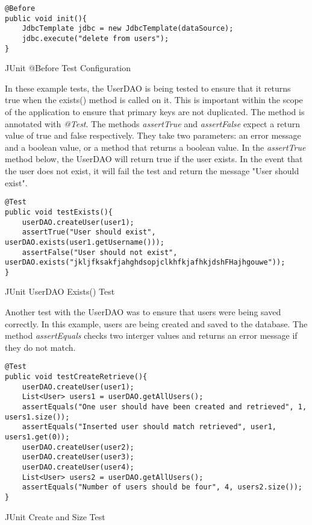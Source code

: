 \begin{table}[H]
\begin{lstlisting}
@Before
public void init(){
	JdbcTemplate jdbc = new JdbcTemplate(dataSource);
	jdbc.execute("delete from users"); 
}
\end{lstlisting}
\caption{JUnit @Before Test Configuration}
\end{table}

In these example tests, the UserDAO is being tested to ensure that it returns true when the exists() method is called on it. This is important within the scope of the application to ensure that primary keys are not duplicated. The method is annotated with \textit{@Test}. The methods \textit{assertTrue} and \textit{assertFalse} expect a return value of true and false respectively. They take two parameters: an error message and a boolean value, or a method that returns a boolean value. In the \textit{assertTrue} method below, the UserDAO will return true if the user exists. In the event that the user does not exist, it will fail the test and return the message "User should exist".\newline 

\begin{table}[H]
\begin{lstlisting}
@Test
public void testExists(){
	userDAO.createUser(user1);
	assertTrue("User should exist", userDAO.exists(user1.getUsername()));
	assertFalse("User should not exist", userDAO.exists("jkljfksakfjahghdsopjclkhfkjafhkjdshFHajhgouwe"));
}
\end{lstlisting}
\caption{JUnit UserDAO Exists() Test}
\end{table}

Another test with the UserDAO was to ensure that users were being saved correctly. In this example, users are being created and saved to the database. The method \textit{assertEquals} checks two interger values and returns an error message if they do not match.

\begin{table}[H]
\begin{lstlisting}
@Test 
public void testCreateRetrieve(){
	userDAO.createUser(user1);
	List<User> users1 = userDAO.getAllUsers();
	assertEquals("One user should have been created and retrieved", 1, users1.size());
	assertEquals("Inserted user should match retrieved", user1, users1.get(0));
	userDAO.createUser(user2);
	userDAO.createUser(user3);
	userDAO.createUser(user4);
	List<User> users2 = userDAO.getAllUsers();
	assertEquals("Number of users should be four", 4, users2.size());
}
\end{lstlisting}
\caption{JUnit Create and Size Test}
\end{table}


